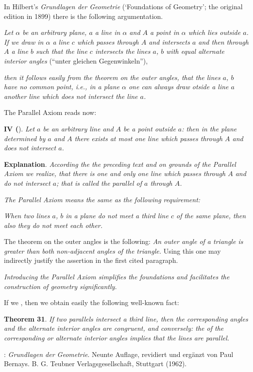 \documentclass[12pt]{article}
\theoremstyle{definition}
\begin{document}
In Hilbert's {\em Grundlagen der Geometrie} (`Foundations of Geometry'; the original edition in 1899) there is the following argumentation.

{\em Let $\alpha$ be an arbitrary plane, $a$ a line in $\alpha$ and $A$ a point in $\alpha$ which lies outside $a$.  If we draw in $\alpha$ a line $c$ which passes through $A$ and intersects $a$ and then through $A$ a line $b$ such that the line $c$ intersects the lines $a$, $b$ with equal alternate interior angles} (``unter gleichen Gegenwinkeln''), {\em then it follows easily from the theorem on the outer angles, that the lines $a$, $b$ have no common point, i.e., in a plane $\alpha$ one can always draw otside a line $a$ another line which does not intersect the line $a$.

The Parallel Axiom reads now:}

\textbf{IV (}).  {\em Let $a$ be an arbitrary line and $A$ be a point outside $a$:  then in the plane determined by $a$ and $A$ there exists at most one line which passes through $A$ and does not intersect $a$.}

\textbf{Explanation}.  {\em According the the preceding text and on grounds of the Parallel Axiom we realize, that there is one and only one line which passes through $A$ and do not intersect $a$; that is called the parallel of $a$ through $A$.}

{\em The Parallel Axiom means the same as the following requirement:}

{\em When two lines $a$, $b$ in a plane do not meet a third line $c$ of the same plane, then also they do not meet each other.}

The theorem on the outer angles is the following:  {\em An outer angle of a triangle is greater than both non-adjacent angles of the triangle.}  Using this one may indirectly justify the assertion in the first cited paragraph.


{\em Introducing the Parallel Axiom simplifies the foundations and  facilitates the construction of geometry significantly.

If we , then we obtain easily the following well-known fact:}

\textbf{Theorem 31}.  {\em If two parallels intersect a third line, then the  corresponding angles and the alternate interior angles are congruent, and conversely: the  of the corresponding or alternate interior angles implies that the lines are parallel.} 


\begin{thebibliography}{8}
: {\em Grundlagen der Geometrie}. Neunte Auflage, revidiert und erg\"anzt von Paul Bernays.\;  B. G. Teubner Verlagsgesellschaft, Stuttgart (1962).
\end{thebibliography} 

\end{document}
